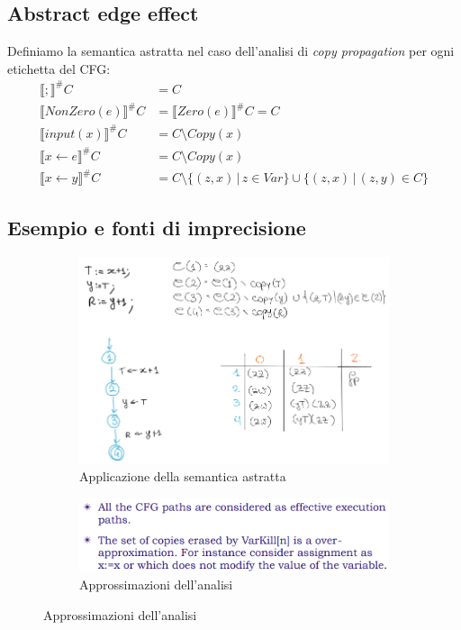\documentclass[a4paper,oneside,titlepage]{book}
\begin{document}
\subsection{Abstract edge effect}
\label{copy3}
Definiamo la semantica astratta nel caso dell'analisi di \textit{copy propagation} per ogni etichetta del CFG:
\begin{align*}
    \llbracket ; \rrbracket^\# C &= C \\
    \llbracket NonZero(e) \rrbracket^\# C &= \llbracket Zero(e) \rrbracket^\# C = C \\
    \llbracket input(x) \rrbracket^\# C &= C \setminus Copy(x) \\
    \llbracket x \leftarrow e \rrbracket^\# C &= C \setminus Copy(x) \\
    \llbracket x \leftarrow y \rrbracket^\# C &= C \setminus \{ (z,x) \, | \, z \in Var \} \cup \{ (z,x) \, | \, (z,y) \in C \}
\end{align*}

\subsection{Esempio e fonti di imprecisione}
\label{copy5}
\begin{figure}[htp]
	\begin{subfigure}{0.49\textwidth}
	    \centering
		\includegraphics[width=\textwidth, height=\textheight, keepaspectratio]{copy3.png}
		\caption{Applicazione della semantica astratta}
	\end{subfigure}
	\hfill
	\begin{subfigure}{0.49\textwidth}
	    \centering
		\includegraphics[width=\textwidth, height=\textheight, keepaspectratio]{copy4.png} 
		\caption{Approssimazioni dell'analisi}
	\end{subfigure}
\end{figure}
\end{document}

